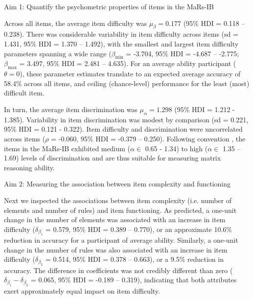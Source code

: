 \documentclass[a4paper,man,natbib]{apa6}
\makeatletter
\renewcommand{\subsubsection}{\@startsection{subsubsection}{3}
  {\z@}%
  {\b@level@two@skip}{\e@level@two@skip}%
  {\normalfont\normalsize\bfseries}}
\makeatother
\begin{document}
\subsubsection{Aim 1: Quantify the psychometric properties of items in the MaRs-IB}

Across all items, the average item difficulty was $\mu_\beta = 0.177$ (95\% HDI = 0.118 -- 0.238). There was considerable variability in item difficulty across items (sd = 1.431, 95\% HDI = 1.370 -- 1.492), with the smallest  and largest item difficulty parameters spanning a wide range ($\beta_{\min}$ = -3.704, 95\% HDI = -4.687 -- -2.775; $\beta_{\max}$ = 3.497, 95\% HDI = 2.481 -- 4.635). For an average ability participant ($\theta = 0$), these parameter estimates translate to an expected average accuracy of 58.4\% across all items, and ceiling (chance-level) performance for the least (most) difficult item.

In turn, the average item discrimination was $\mu_\alpha = 1.298$ (95\% HDI = 1.212 - 1.385). Variability in item discrimination was modest by comparison (sd = 0.221, 95\% HDI = 0.121 - 0.322). Item difficulty and discrimination were uncorrelated across items ($\rho$ = -0.060, 95\% HDI = -0.379 -- 0.250). Following convention \citep{baker2017basics}, the items in the MaRs-IB exhibited medium ($\alpha \in$ 0.65 - 1.34) to high ($\alpha \in$ 1.35 – 1.69) levels of discrimination and are thus suitable for measuring matrix reasoning ability.

\subsubsection{Aim 2: Measuring the association between item complexity and functioning}

Next we inspected the associations between item complexity (i.e. number of elements and number of rules) and item functioning. As predicted, a one-unit change in the number of elements was associated with an increase in item difficulty ($\delta_{\beta_1}$ = 0.579, 95\% HDI = 0.389 -- 0.770), or an approximate 10.6\% reduction in accuracy for a participant of average ability. Similarly, a one-unit change in the number of rules was also associated with an increase in item difficulty ($\delta_{\beta_2}$ = 0.514, 95\% HDI = 0.378 -- 0.663), or a 9.5\% reduction in accuracy. The difference in coefficients was not credibly different than zero ($\delta_{\beta_1} - \delta_{\beta_2}$ = 0.065, 95\% HDI = -0.189 -- 0.319), indicating that both attributes exert approximately equal impact on item difficulty.
\end{document}
